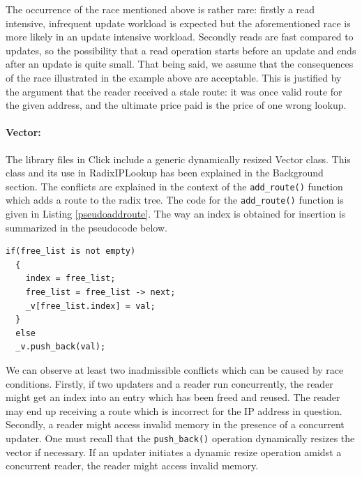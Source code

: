 \documentclass[a4paper,marginparwidth=50pt,marginparsep=10pt]{article}
\begin{document}
The occurrence of the race mentioned above is rather rare: firstly a read intensive, infrequent update workload is expected but the aforementioned race is more likely in an update intensive workload. Secondly reads are fast compared to updates, so the possibility that a read operation starts before an update and ends after an update is quite small. That being said, we assume that the consequences of the race illustrated in the example above are acceptable. This is justified by the argument that the reader received a stale route: it was once valid route for the given address, and the ultimate price paid is the price of one wrong lookup.
\paragraph{Vector:}
The library files in Click include a generic dynamically resized Vector class. This class and its use in RadixIPLookup has been explained in the Background section. The conflicts are explained in the context of the \verb+add_route()+ function which adds a route to the radix tree. The code for the \verb+add_route()+ function is given in Listing \ref{pseudoaddroute}. The way an index is obtained for insertion is summarized in the pseudocode below. 
\begin{lstlisting}[caption = Pseudocode for acquiring an index in add\_route, label=pseudoaddroute]
  if(free_list is not empty)
  {
    index = free_list;
    free_list = free_list -> next;
    _v[free_list.index] = val;
  }
  else 
  _v.push_back(val);
\end{lstlisting}
We can observe at least two inadmissible conflicts which can be caused by race conditions. Firstly, if two updaters and a reader run concurrently, the reader might get an index into an entry which has been freed and reused. The reader may end up receiving a route which is incorrect for the IP address in question. Secondly, a reader might access invalid memory in the presence of a concurrent updater. One must recall that the \verb+push_back()+ operation dynamically resizes the vector if necessary. If an updater initiates a dynamic resize operation amidst a concurrent reader, the reader might access invalid memory.
\end{document}
